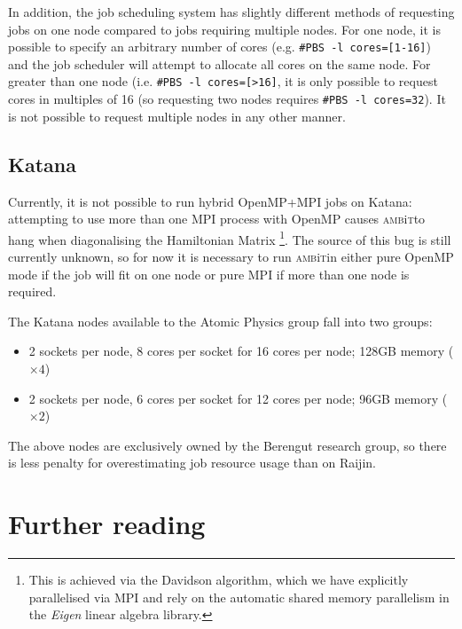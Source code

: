 \documentclass{report}
\newcommand{\ambit}{\textsc{amb}{\footnotesize i}\textsc{t}}
\begin{document}
In addition, the job scheduling system has slightly different methods of requesting jobs on one node 
compared to jobs requiring multiple nodes. For one node, it is possible to specify an arbitrary number of
cores (e.g. \texttt{\#PBS -l cores=[1-16]}) and the job scheduler will attempt to allocate all cores on 
the same node. For greater than one node (i.e. \texttt{\#PBS -l cores=[>16]}, it is only possible to 
request cores in multiples of 16 (so requesting two nodes requires \texttt{\#PBS -l cores=32}). It is 
not possible to request multiple nodes in any other manner.

\subsection{Katana}

Currently, it is not possible to run hybrid OpenMP+MPI jobs on Katana: attempting to use more than one
MPI process with OpenMP causes \ambit to hang when diagonalising the Hamiltonian Matrix \footnote{This is
achieved via the Davidson algorithm, which we have explicitly parallelised via MPI and rely on the
automatic shared memory parallelism in the \textit{Eigen} linear algebra library.}. The source of this
bug is still currently unknown, so for now it is necessary to run \ambit in either pure OpenMP mode if
the job will fit on one node or pure MPI if more than one node is required.

The Katana nodes available to the Atomic Physics group fall into two groups:

\begin{itemize}
\item 2 sockets per node, 8 cores per socket for 16 cores per node; 128GB memory ($\times 4$)
\item 2 sockets per node, 6 cores per socket for 12 cores per node; 96GB memory ($\times 2$)
\end{itemize}

The above nodes are exclusively owned by the Berengut research group, so there is less penalty for
overestimating job resource usage than on Raijin.

\section{Further reading}
\end{document}
